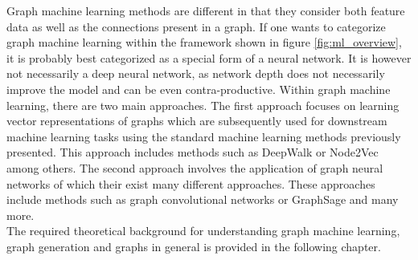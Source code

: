 	\noindent Graph machine learning methods are different in that they consider 
	both feature data as well as the connections present in a graph. If one wants 
	to categorize graph machine learning within the framework shown in figure 
	\ref{fig:ml_overview}, it is probably best categorized as a special form of 
	a neural network. It is however not necessarily a deep neural network, as 
	network depth does not necessarily improve the model and can be even 
	contra-productive. Within graph machine learning, there are two main
	approaches. The first approach focuses on learning vector representations
	of graphs which are subsequently used for downstream machine learning tasks
	using the standard machine learning methods previously presented. This
	approach includes methods such as DeepWalk \citep{perozzi2014deepwalk} or
	Node2Vec \citep{grover2016node2vec} among others. The second approach
	involves the application of graph neural networks of which their exist many
	different approaches. These approaches include methods such as graph
	convolutional networks \citep{kipf2016semi} or GraphSage
	\citep{hamilton2017inductive} and many more. \\

	\noindent The required theoretical background for understanding graph
	machine learning, graph generation and graphs in general is
	provided in the following chapter.
